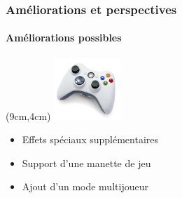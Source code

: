 \begin{frame}

\frametitle{Améliorations et perspectives}
	\framesubtitle{Améliorations possibles}


	\begin{textblock*}{2.5cm}(9cm,4cm)
		\includegraphics[width=2.5cm]{figures/pad_xbox.png}
	\end{textblock*}


	\begin{itemize}
		\item Effets spéciaux supplémentaires
	\end{itemize}
	
	\begin{itemize}
		\item Support d'une manette de jeu
	\end{itemize}

	\begin{itemize}
		\item Ajout d'un mode multijoueur
	\end{itemize}
	

\end{frame}
